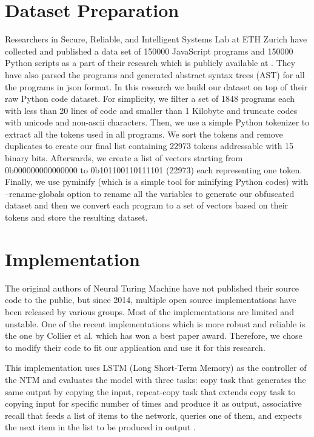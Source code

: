 \documentclass[acmsmall]{acmart}
\begin{document}
\section{Dataset Preparation}
Researchers in Secure, Reliable, and Intelligent Systems Lab \cite{} at ETH Zurich have collected and published a data set of 150000 JavaScript programs and 150000 Python scripts as a part of their research \cite{jsnice} which is publicly available at \cite{bigcodedataset}. They have also parsed the programs and generated abstract syntax trees (AST) for all the programs in json format. In this research we build our dataset on top of their raw Python code dataset. For simplicity, we filter a set of 1848 programs each with less than 20 lines of code and smaller than 1 Kilobyte and truncate codes with unicode and non-ascii characters. Then, we use a simple Python tokenizer \cite{tokenizer} to extract all the tokens used in all programs. We sort the tokens and remove duplicates to create our final list containing 22973 tokens addressable with 15 binary bits. Afterwards, we create a list of vectors starting from 0b000000000000000 to 0b101100110111101 (22973) each representing one token. Finally, we use pyminify \cite{pyminify} (which is a simple tool for minifying Python codes) with --rename-globals option to rename all the variables to generate our obfuscated dataset and then we convert each program to a set of vectors based on their tokens and store the resulting dataset.

\section{Implementation}
The original authors of Neural Turing Machine have not published their source code to the public, but since 2014, multiple open source implementations have been released by various groups. Most of the implementations are limited and unstable. One of the recent implementations which is more robust and reliable is the one by Collier et al. \cite{collier} which has won a best paper award. Therefore, we chose to modify their code to fit our application and use it for this research.

This implementation uses LSTM (Long Short-Term Memory) \cite{lstm} as the controller of the NTM and evaluates the model with three tasks: copy task that generates the same output by copying the input, repeat-copy task that extends copy task to copying input for specific number of times and produce it as output, associative recall that feeds a list of items to the network, queries one of them, and expects the next item in the list to be produced in output \cite{}.
\end{document}
